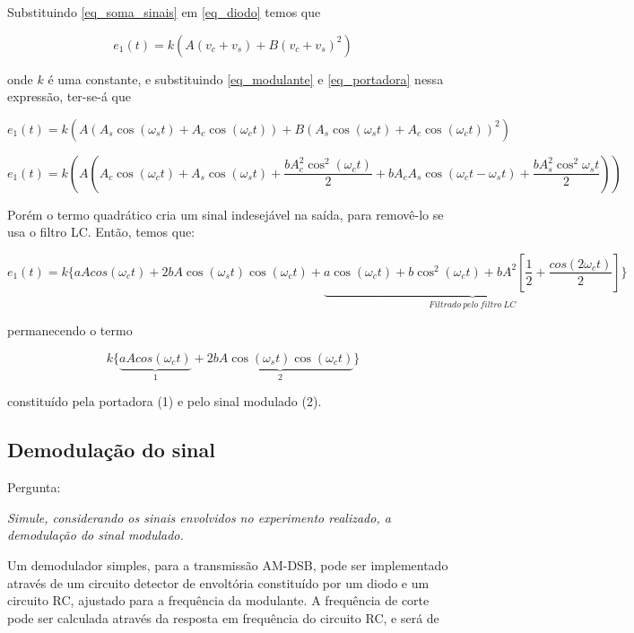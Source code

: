 \documentclass[]{report}
\begin{document}
Substituindo \ref{eq_soma_sinais} em \ref{eq_diodo} temos que

\begin{equation}
e_1(t) = k (A (v_c + v_s) + B (v_c + v_s)^2)
\end{equation}

onde $k$ é uma constante, e substituindo \ref{eq_modulante} e \ref{eq_portadora} nessa expressão, ter-se-á que

\begin{equation}
e_1(t) = k(A(A_s \cos(\omega_s t) + A_c \cos(\omega_c t)) + B(A_s \cos(\omega_s t) + A_c \cos(\omega_c t))^2)
\end{equation}

\begin{equation}
e_1(t) = k(A (A_c \cos(\omega_c t) + A_s \cos(\omega_s t) + \frac{b A_c^2 \cos^2(\omega_c t)}{2} + b A_c A_s \cos(\omega_c t - \omega_s t) + \frac{b A_s^2 \cos^2{\omega_s t}}{2}))
\end{equation}

Porém o termo quadrático cria um sinal indesejável na saída, para removê-lo se usa o filtro LC. Então, temos que:

\begin{equation}
e_1(t) = k \{a A cos(\omega_c t) + 2 b A \cos(\omega_s t) \cos(\omega_c t) + \underbrace{a \cos(\omega_c t) + b \cos^2(\omega_c t) + b A^2 [\frac{1}{2} + \frac{cos(2 \omega_c t)}{2}]}_{Filtrado\ pelo\ filtro \ LC}\}
\end{equation}

permanecendo o termo

\begin{equation}
k\{\underbrace{a A cos(\omega_c t)}_{1} + \underbrace{2 b A \cos(\omega_s t) \cos(\omega_c t)}_{2}\}
\end{equation}

constituído pela portadora (1) e pelo sinal modulado (2).


\subsection{Demodulação do sinal}
Pergunta: 
\begin{flushright}
\textit{Simule, considerando os sinais envolvidos no experimento realizado, a demodulação do sinal modulado.}
\end{flushright}
Um demodulador simples, para a transmissão AM-DSB, pode ser implementado através de um circuito detector de envoltória constituído por um diodo e um circuito RC, ajustado para a frequência da modulante. A frequência de corte pode ser calculada através da resposta em frequência do circuito RC, e será de
\end{document}
